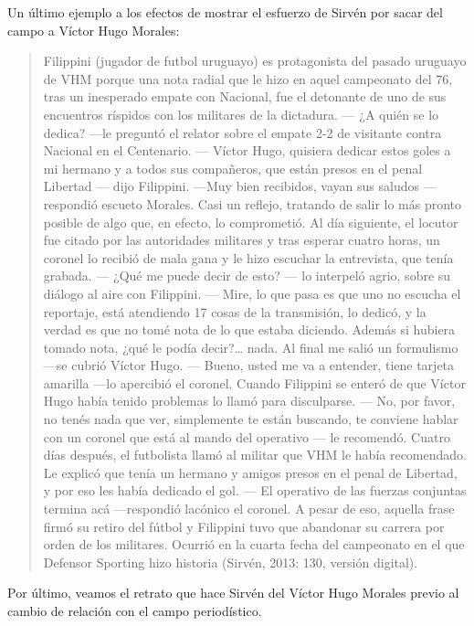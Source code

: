 Un último ejemplo a los efectos de mostrar el esfuerzo de Sirvén por sacar del campo a Víctor Hugo Morales:

\begin{quote}
Filippini (jugador de futbol uruguayo) es protagonista del pasado uruguayo de VHM porque una nota radial que le hizo en aquel campeonato del 76, tras un inesperado empate con Nacional, fue el detonante de uno de sus encuentros ríspidos con los militares de la dictadura. --- ¿A quién se lo dedica? ---le preguntó el relator sobre el empate 2-2 de visitante contra Nacional en el Centenario. --- Víctor Hugo, quisiera dedicar estos goles a mi hermano y a todos sus compañeros, que están presos en el penal Libertad --- dijo Filippini. ---Muy bien recibidos, vayan sus saludos ---respondió escueto Morales. Casi un reflejo, tratando de salir lo más pronto posible de algo que, en efecto, lo comprometió. Al día siguiente, el locutor fue citado por las autoridades militares y tras esperar cuatro horas, un coronel lo recibió de mala gana y le hizo escuchar la entrevista, que tenía grabada. --- ¿Qué me puede decir de esto? --- lo interpeló agrio, sobre su diálogo al aire con Filippini. --- Mire, lo que pasa es que uno no escucha el reportaje, está atendiendo 17 cosas de la transmisión, lo dedicó, y la verdad es que no tomé nota de lo que estaba diciendo. Además si hubiera tomado nota, ¿qué le podía decir?\ldots{} nada. Al final me salió un formulismo ---se cubrió Víctor Hugo. --- Bueno, usted me va a entender, tiene tarjeta amarilla ---lo apercibió el coronel. Cuando Filippini se enteró de que Víctor Hugo había tenido problemas lo llamó para disculparse. --- No, por favor, no tenés nada que ver, simplemente te están buscando, te conviene hablar con un coronel que está al mando del operativo --- le recomendó. Cuatro días después, el futbolista llamó al militar que VHM le había recomendado. Le explicó que tenía un hermano y amigos presos en el penal de Libertad, y por eso les había dedicado el gol. --- El operativo de las fuerzas conjuntas termina acá ---respondió lacónico el coronel. A pesar de eso, aquella frase firmó su retiro del fútbol y Filippini tuvo que abandonar su carrera por orden de los militares. Ocurrió en la cuarta fecha del campeonato en el que Defensor Sporting hizo historia (Sirvén, 2013: 130, versión digital).
\end{quote}

Por último, veamos el retrato que hace Sirvén del Víctor Hugo Morales previo al cambio de relación con el campo periodístico.

